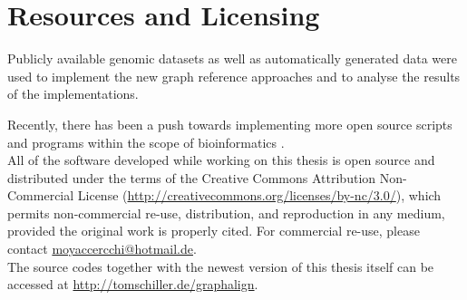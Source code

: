 \documentclass[a4paper,12pt,twoside,BCOR=10mm]{scrbook}
\begin{document}
\section{Resources and Licensing}
%

Publicly available genomic datasets as well as automatically generated data were used 
to implement the new graph reference approaches and to analyse the results of the implementations.

Recently, there has been a push towards implementing more open source scripts 
and programs within the scope of bioinformatics \citep{MANIFESTO}. \\
All of the software developed while working on this thesis 
is open source and distributed under the terms of 
the Creative Commons Attribution Non-Commercial License 
(\url{http://creativecommons.org/licenses/by-nc/3.0/}), 
which permits non-commercial re-use, distribution, and reproduction in any medium, 
provided the original work is properly cited. 
For commercial re-use, please contact \url{moyaccercchi@hotmail.de}. \\
The source codes together with the newest version of this thesis itself can be accessed at \url{http://tomschiller.de/graphalign}.
% 

%
%
%
%
\end{document}
